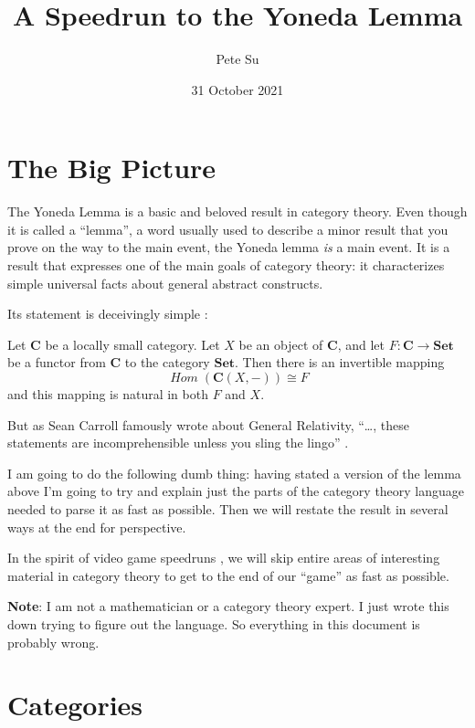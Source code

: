 \documentclass[12pt]{article}
\theoremstyle{definition}
\theoremstyle{definition}
\theoremstyle{definition}
\numberwithin{equation}{section}
\newcommand{\cat}[1]{\mathbf{#1}}      %
\newcommand{\fcat}[1]{{\mathbf {#1}}}    %
\newcommand{\CC}{\cat{C}}
\DeclareMathOperator{\Hom}{\mathit{Hom}}
\newcommand{\Set}{\fcat{Set}}           %
\newcommand{\iso}{\cong}                %
\def\pg{\bigskip\goodbreak
\ni}
\def\ni{\goodbreak\noindent}
\begin{document}
\title{\Large A Speedrun to the Yoneda Lemma}
\author{\large Pete Su}
\date{\large 31 October 2021}

\maketitle


\section{The Big Picture}

The Yoneda Lemma is a basic and beloved result in category theory. Even though it is called
a ``lemma'', a word usually used to describe a minor result that you prove on the way
to the main event, the Yoneda lemma {\it is} a main event. It is a result that expresses
one of the main goals of category theory: it characterizes simple universal facts
about general abstract constructs.

Its statement is deceivingly simple \cite{Rhiel2016}:

\pg
Let $\CC$ be a locally small category. Let $X$ be an
object of $\CC$, and let $F: \CC \to \Set$ be a functor from $\CC$ to the category $\Set$.
Then there is an invertible mapping
$$
\Hom(\CC(X, -)) \iso F
$$
and this mapping is natural in both $F$ and $X$.

\pg
But as Sean Carroll famously wrote about General Relativity, ``\dots, 
these statements are incomprehensible unless you sling the lingo'' \cite{carroll}.

I am going to do the following dumb thing: having stated a version of the lemma above
I'm going to try and explain just the parts of the category theory language needed to parse it
as fast as possible. Then we will restate the result in several ways at the end for perspective.

In the spirit of video game speedruns \cite{lobos},
we will skip entire areas of interesting material in category theory to get to the end
of our ``game'' as fast as possible.

\pg
{\bf Note}: I am not a mathematician or a category theory expert. I just wrote this
down trying to figure out the language.
So everything in this document is probably wrong.

\goodbreak
\section{Categories}
\end{document}
